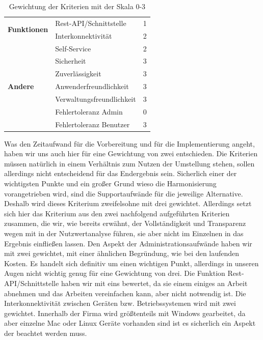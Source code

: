 \begin{table}
\begin{tabular}{l|l|l|}
		\cline{2-3}
		\multirow{2}{6em}{\textbf{Funktionen}} & Rest-API/Schnittstelle              & 1                   \\
		~                                      & Interkonnektivität                  & 2                   \\
		\cline{2-3}
		\multirow{7}{6em}{\textbf{Andere}}     & Self-Service                        & 2                   \\
		~                                      & Sicherheit                          & 3                   \\
		~                                      & Zuverlässigkeit                     & 3                   \\
		~                                      & Anwenderfreundlichkeit              & 3                   \\
		~                                      & Verwaltungsfreundlichkeit           & 3                   \\
		~                                      & Fehlertoleranz Admin                & 0                   \\
		~                                      & Fehlertoleranz Benutzer             & 3                   \\
		\cline{2-3}
	\end{tabular}
	\caption[Gewichtung der Kriterien mit der Skala 0-3]{Gewichtung der Kriterien mit der Skala 0-3}
	\label{tab:Gewichtungen}
\end{table}

Was den Zeitaufwand für die Vorbereitung und für die Implementierung angeht, haben wir uns auch hier für eine Gewichtung von zwei entschieden. Die Kriterien müssen natürlich in einem Verhältnis zum Nutzen der Umstellung stehen, sollen allerdings nicht entscheidend für das Endergebnis sein. Sicherlich einer der wichtigsten Punkte und ein großer Grund wieso die Harmonisierung vorangetrieben wird, sind die Supportaufwände für die jeweilige Alternative. Deshalb wird dieses Kriterium zweifelsohne mit drei gewichtet. Allerdings setzt sich hier das Kriterium aus den zwei nachfolgend aufgeführten Kriterien zusammen, die wir, wie bereits erwähnt, der Vollständigkeit und Transparenz wegen mit in der Nutzwertanalyse führen, sie aber nicht im Einzelnen in das Ergebnis einfließen lassen. Den Aspekt der Administrationsaufwände haben wir mit zwei gewichtet, mit einer ähnlichen Begründung, wie bei den laufenden Kosten. Es handelt sich definitiv um einen wichtigen Punkt, allerdings in unseren Augen nicht wichtig genug für eine Gewichtung von drei.
Die Funktion Rest-API/Schnittstelle haben wir mit eins bewertet, da sie einem einiges an Arbeit abnehmen und das Arbeiten vereinfachen kann, aber nicht notwendig ist. Die Interkonnektivität zwischen Geräten bzw. Betriebssystemen wird mit zwei gewichtet. Innerhalb der Firma wird größtenteils mit Windows gearbeitet, da aber einzelne Mac oder Linux Geräte vorhanden sind ist es sicherlich ein Aspekt der beachtet werden muss.

